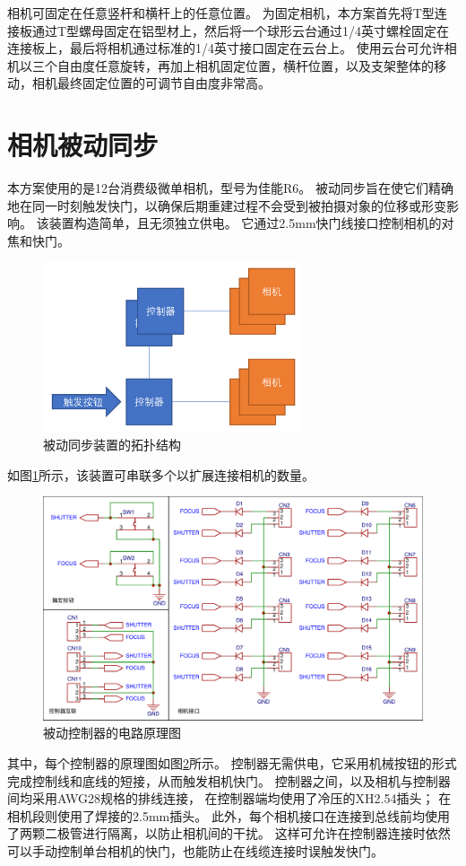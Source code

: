 \documentclass{ctexart}
\begin{document}
相机可固定在任意竖杆和横杆上的任意位置。
为固定相机，本方案首先将T型连接板通过T型螺母固定在铝型材上，然后将一个球形云台通过1/4英寸螺栓固定在连接板上，最后将相机通过标准的1/4英寸接口固定在云台上。
使用云台可允许相机以三个自由度任意旋转，再加上相机固定位置，横杆位置，以及支架整体的移动，相机最终固定位置的可调节自由度非常高。

\section{相机被动同步}

本方案使用的是12台消费级微单相机，型号为佳能R6。
被动同步旨在使它们精确地在同一时刻触发快门，以确保后期重建过程不会受到被拍摄对象的位移或形变影响。
该装置构造简单，且无须独立供电。
它通过2.5mm快门线接口控制相机的对焦和快门。

\begin{figure}
    \centering
    \includegraphics[height=5cm]{figures/passive_sync_topo}
    \caption{被动同步装置的拓扑结构}
    \label{fig:passive_sync_topo}
\end{figure}
如图\ref{fig:passive_sync_topo}所示，该装置可串联多个以扩展连接相机的数量。
\begin{figure}
    \includegraphics[width=\textwidth]{figures/passive_sync_schematic}
    \caption{被动控制器的电路原理图}
    \label{fig:passive_sync_schematic}
\end{figure}
其中，每个控制器的原理图如图\ref{fig:passive_sync_schematic}所示。
控制器无需供电，它采用机械按钮的形式完成控制线和底线的短接，从而触发相机快门。
控制器之间，以及相机与控制器间均采用AWG28规格的排线连接，
在控制器端均使用了冷压的XH2.54插头；
在相机段则使用了焊接的2.5mm插头。
此外，每个相机接口在连接到总线前均使用了两颗二极管进行隔离，以防止相机间的干扰。
这样可允许在控制器连接时依然可以手动控制单台相机的快门，也能防止在线缆连接时误触发快门。
\end{document}

